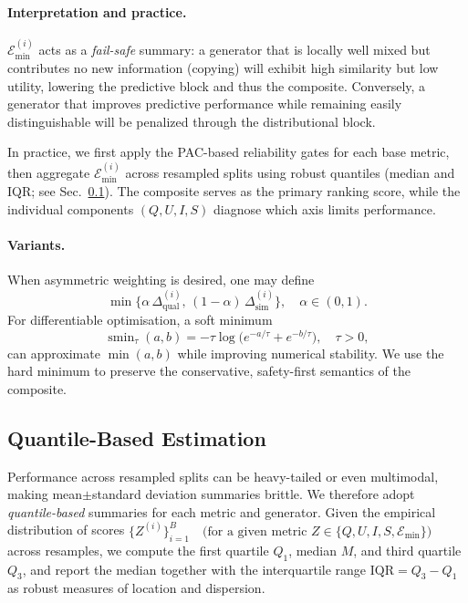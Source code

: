 \paragraph{Interpretation and practice.}
$\mathcal{E}_{\min}^{(i)}$ acts as a \emph{fail-safe} summary: a generator that
is locally well mixed but contributes no new information (copying) will exhibit
high similarity but low utility, lowering the predictive block and thus the
composite. Conversely, a generator that improves predictive performance while
remaining easily distinguishable will be penalized through the distributional
block.

In practice, we first apply the PAC-based reliability gates for each base
metric, then aggregate $\mathcal{E}_{\min}^{(i)}$ across resampled splits using
robust quantiles (median and IQR; see
Sec.~\ref{sec:quantile-based-estimation}). The composite serves as the primary
ranking score, while the individual components $(Q,U,I,S)$ diagnose which axis
limits performance.

\paragraph{Variants.}
When asymmetric weighting is desired, one may define
\[
\min\!\bigl\{\alpha\,\Delta_{\mathrm{qual}}^{(i)},\,
(1-\alpha)\,\Delta_{\mathrm{sim}}^{(i)}\bigr\},
\quad \alpha\in(0,1).
\]
For differentiable optimisation, a soft minimum
\[
\operatorname{smin}_\tau(a,b)
= -\tau \log\bigl(e^{-a/\tau}+e^{-b/\tau}\bigr),
\quad \tau>0,
\]
can approximate $\min(a,b)$ while improving numerical stability. We use the
hard minimum to preserve the conservative, safety-first semantics of the
composite.

\subsection{Quantile-Based Estimation}
\label{sec:quantile-based-estimation}

Performance across resampled splits can be heavy-tailed or even multimodal,
making mean$\pm$standard deviation summaries brittle. We therefore adopt
\emph{quantile-based} summaries for each metric and generator. Given the
empirical distribution of scores $\{Z^{(i)}\}_{i=1}^{B} \quad \text{(for a given metric } Z \in \{Q,U,I,S,\mathcal{E}_{\min}\})$ across resamples, we
compute the first quartile $Q_1$, median $M$, and third quartile $Q_3$, and
report the median together with the interquartile range
$\mathrm{IQR}=Q_3-Q_1$ as robust measures of location and dispersion.

